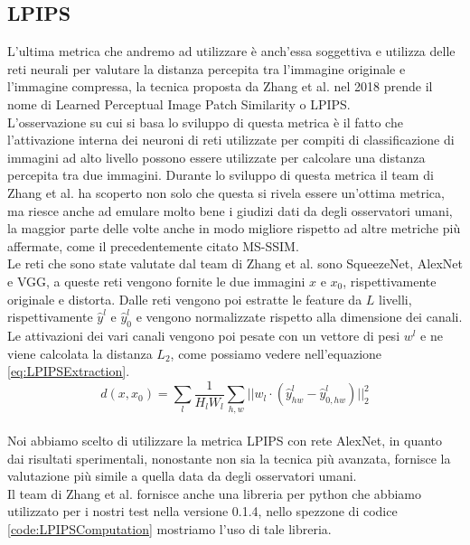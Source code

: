 \subsection{LPIPS}
L’ultima metrica che andremo ad utilizzare è anch'essa soggettiva e utilizza delle reti neurali per valutare la distanza percepita tra l’immagine originale e l’immagine compressa, la tecnica proposta da Zhang et al. nel 2018 \cite{zhang2018unreasonable} prende il nome di Learned Perceptual Image Patch Similarity o LPIPS.\\
L’osservazione su cui si basa lo sviluppo di questa metrica è il fatto che l’attivazione interna dei neuroni di reti utilizzate per compiti di classificazione di immagini ad alto livello possono essere utilizzate per calcolare una distanza percepita tra due immagini. Durante lo sviluppo di questa metrica il team di Zhang et al. ha scoperto non solo che questa si rivela essere un’ottima metrica, ma riesce anche ad emulare molto bene i giudizi dati da degli osservatori umani, la maggior parte delle volte anche in modo migliore rispetto ad altre metriche più affermate, come il precedentemente citato MS-SSIM.\\
Le reti che sono state valutate dal team di Zhang et al. sono SqueezeNet, AlexNet e VGG, a queste reti vengono fornite le due immagini $x$ e $x_{0}$, rispettivamente originale e distorta. Dalle reti vengono poi estratte le feature da $L$ livelli, rispettivamente $\hat{y}^l$ e $\hat{y}_{0}^l$ e vengono normalizzate rispetto alla dimensione dei canali. Le attivazioni dei vari canali vengono poi pesate con un vettore di pesi $w^l$ e ne viene calcolata la distanza $L_{2}$, come possiamo vedere nell’equazione \ref{eq:LPIPSExtraction}.\\
\begin{equation}\label{eq:LPIPSExtraction}
    d(x,x_{0}) = \sum_{l}\dfrac{1}{H_{l}W_{l}} \sum_{h,w} || w_{l} \cdot (\hat{y}_{hw}^{l} - \hat{y}_{0,hw}^{l}) ||_{2}^{2}
\end{equation}\\
Noi abbiamo scelto di utilizzare la metrica LPIPS con rete AlexNet, in quanto dai risultati sperimentali, nonostante non sia la tecnica più avanzata, fornisce la valutazione più simile a quella data da degli osservatori umani.\\
Il team di Zhang et al. fornisce anche una libreria per python che abbiamo utilizzato per i nostri test nella versione 0.1.4, nello spezzone di codice \ref{code:LPIPSComputation} mostriamo l'uso di tale libreria.\\
